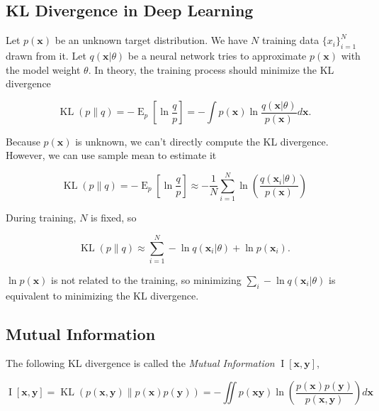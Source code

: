 \documentclass{article}
\begin{document}
        \subsection{KL Divergence in Deep Learning}

            Let $ p(\mathbf{x}) $ be an unknown target distribution. We have $
            N $ training data $ \{ x_{i} \}_{i=1}^{N} $ drawn from it. Let $
            q(\mathbf{x} | \theta) $ be a neural network tries to approximate $
            p(\mathbf{x}) $ with the model weight $ \theta $. In theory, the 
            training process should minimize the KL divergence

            \begin{equation*}
                 \operatorname{KL}(p \| q) = -\operatorname{E}_{p} \left[ \ln
                 \frac{q}{p} \right] = - \int p(\mathbf{x}) \ln
                 \frac{q(\mathbf{x} | \theta)}{p(\mathbf{x})} d \mathbf{x}.
            \end{equation*}

            Because $ p(\mathbf{x}) $ is unknown, we can't directly compute the
            KL divergence. However, we can use sample mean to estimate it

            \begin{equation*}
                 \operatorname{KL}(p \| q) = -\operatorname{E}_{p} \left[ \ln
                 \frac{q}{p} \right] \approx -\frac{1}{N} \sum_{i=1}^{N} \ln
                 \left( \frac{q(\mathbf{x}_{i} | \theta)}{p(\mathbf{x})} \right)
            \end{equation*}

            During training, $ N $ is fixed, so

            \begin{equation*}
                 \operatorname{KL}(p \| q) \approx \sum_{i=1}^{N} -\ln
                 q(\mathbf{x}_{i} | \theta) + \ln p(\mathbf{x}_{i}).
            \end{equation*}

            $ \ln p(\mathbf{x}) $ is not related to the training, so minimizing
            $ \sum_{i} -\ln q(\mathbf{x}_{i} | \theta) $ is equivalent to
            minimizing the KL divergence.

        \subsection{Mutual Information}

           The following KL divergence is called the \textit{Mutual
           Information} $ \operatorname{I}[\mathbf{x}, \mathbf{y}] $,

           \begin{equation*}
               \operatorname{I}[\mathbf{x}, \mathbf{y}] =
               \operatorname{KL}(p(\mathbf{x}, \mathbf{y}) \| p(\mathbf{x})
               p(\mathbf{y})) = - \iint p(\mathbf{x} \mathbf{y}) \ln  \left(
                   \frac{p(\mathbf{x}) p(\mathbf{y})}{p(\mathbf{x}, \mathbf{y})}
               \right) d \mathbf{x}
           \end{equation*}
\end{document}
